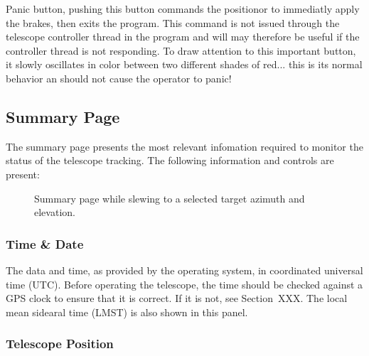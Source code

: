 \documentclass[letterpaper,12pt]{report}
\begin{document}
Panic button, pushing this button commands the positionor to
immediatly apply the brakes, then exits the program. This command is
not issued through the telescope controller thread in the program and
will may therefore be useful if the controller thread is not
responding. To draw attention to this important button, it slowly
oscillates in color between two different shades of red... this is its
normal behavior an should not cause the operator to panic!

\subsection{Summary Page}

The summary page presents the most relevant infomation required to
monitor the status of the telescope tracking. The following
information and controls are present:

\begin{figure}
\centerline{}
\caption{\label{FIG::GUI_SUMMARY} Summary page while slewing to a selected
target azimuth and elevation.}
\end{figure}

\subsubsection{Time \& Date}
The data and time, as provided by the operating system, in coordinated
universal time (UTC). Before operating the telescope, the time should
be checked against a GPS clock to ensure that it is correct. If it is
not, see Section~XXX. The local mean sidearal time (LMST) is also
shown in this panel.

\subsubsection{Telescope Position}
\end{document}
